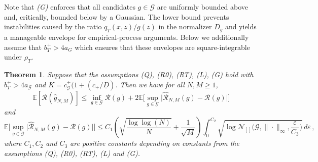 \documentclass[11pt]{article}
\newtheorem{theorem}[proposition]{Theorem}
\theoremstyle{remark}
\numberwithin{equation}{section}
\newcommand{\E}{\mathbb{E}}
\def\bmax{b_T^{+}}
\def\cmax{c_{+}}
\def\aGmin{a_{\mathcal{G}}}
\def\cGmax{c_{\mathcal{G}}^{+}}
\begin{document}
Note that \emph{(G)} enforces that all candidates $g\in\mathcal G$ are uniformly bounded above and,
critically, bounded below by a Gaussian. The lower bound prevents instabilities caused by the ratio
$q_T(x,z)/g(z)$ in the normalizer $D_g$ and yields a manageable envelope for empirical-process
arguments. Below we additionally assume that  $b_T^+>4a_G$ which ensures that these
envelopes are square-integrable under $\rho_T$.

\begin{theorem}
\label{thm:uniform-concentration-risk}
Suppose that the assumptions \emph{(Q)}, \emph{(R0)}, \emph{(RT)}, \emph{(L)}, \emph{(G)} hold with $\bmax > 4 \aGmin$ and $K = \cGmax(1+(\cmax/\underline{D})$. 
Then we have  for all 
$N,M\ge1$,
\begin{equation}
\label{minimizer of R}
\E [\mathcal{R}(\widehat{g}_{N,M})] \le \inf_{g \in \mathcal G} \mathcal{R}(g) + 2 \E
  \Big[
    \sup_{g\in\mathcal{G}}
    \bigl|
      \widehat{\mathcal{R}}_{N,M}(g)
      -
      \mathcal{R}(g)
    \bigr|
  \Big]\, 
  \end{equation}
and
\begin{equation*}
  \E
  \Big[
    \sup_{g\in\mathcal{G}}
    \bigl|
      \widehat{\mathcal{R}}_{N,M}(g)
      -
      \mathcal{R}(g)
    \bigr|
  \Big] \le  C_1\left(\sqrt{\frac{\log\log(N)}{N}}+\frac{1}{\sqrt{M}}\right) \int_{0}^{C_2} \sqrt{\log \mathcal N_{[]}\!\Big(\mathcal G,\|\cdot\|_\infty,\frac{\varepsilon}{C_3}\Big)} \, d\varepsilon \, ,
\end{equation*}
where $C_1,C_2$ and $C_3$ are positive constants depending on constants from the assumptions \emph{(Q)}, \emph{(R0)}, \emph{(RT)}, \emph{(L)} and \emph{(G)}. 
\end{theorem}
\end{document}
